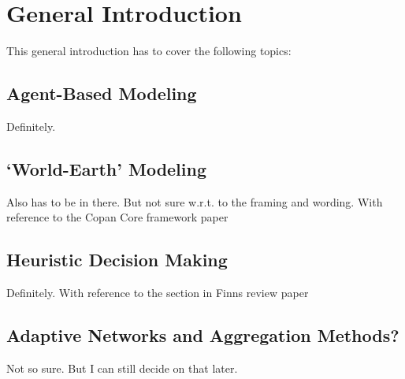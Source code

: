 \chapter{General Introduction}
This general introduction has to cover the following topics:
\section{Agent-Based Modeling}
Definitely.
\section{`World-Earth' Modeling}
Also has to be in there. But not sure w.r.t. to the framing and wording.
With reference to the Copan Core framework paper
\section{Heuristic Decision Making}
Definitely. With reference to the section in Finns review paper
\section{Adaptive Networks and Aggregation Methods?}
Not so sure. But I can still decide on that later.

